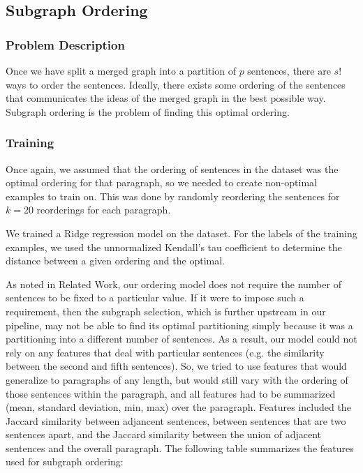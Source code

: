 \documentclass[12pt]{article}
\begin{document}
\subsection{Subgraph Ordering}
\subsubsection{Problem Description}

Once we have split a merged graph into a partition of $p$ sentences, there are
$s!$ ways to order the sentences. Ideally, there exists some ordering of the
sentences that communicates the ideas of the merged graph in the best possible
way. Subgraph ordering is the problem of finding this optimal ordering.

\subsubsection{Training}

Once again, we assumed that the ordering of sentences in the dataset was the
optimal ordering for that paragraph, so we needed to create non-optimal
examples to train on. This was done by randomly reordering the sentences for
$k=20$ reorderings for each paragraph.

We trained a Ridge regression model on the dataset. For the labels of the
training examples, we used the unnormalized Kendall's tau coefficient to
determine the distance between a given ordering and the optimal.

As noted in Related Work, our ordering model does not require the number of
sentences to be fixed to a particular value. If it were to impose such a
requirement, then the subgraph selection, which is further upstream in our
pipeline, may not be able to find its optimal partitioning simply because it
was a partitioning into a different number of sentences. As a result, our model
could not rely on any features that deal with particular sentences (e.g. the
similarity between the second and fifth sentences). So, we tried to use
features that would generalize to paragraphs of any length, but would still
vary with the ordering of those sentences within the paragraph, and all
features had to be summarized (mean, standard deviation, min, max) over the
paragraph. Features included the Jaccard similarity between adjancent
sentences, between sentences that are two sentences apart, and the Jaccard
similarity between the union of adjacent sentences and the overall paragraph.
The following table summarizes the features used for subgraph ordering:
\end{document}
